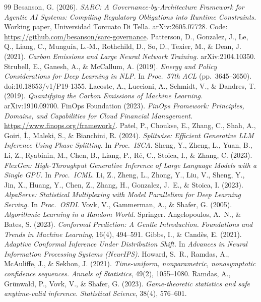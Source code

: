 \documentclass[11pt]{article}
\theoremstyle{plain}
\theoremstyle{definition}
\theoremstyle{remark}
\begin{document}
\begin{thebibliography}{99}
 Besanson, G. (2026). \emph{SARC: A Governance-by-Architecture Framework for Agentic AI Systems: Compiling Regulatory Obligations into Runtime Constraints.} Working paper, Universidad Torcuato Di Tella. arXiv:2605.07728. Code: \url{https://github.com/besanson/sarc-governance}.
 Patterson, D., Gonzalez, J., Le, Q., Liang, C., Mungu\'ia, L.-M., Rothchild, D., So, D., Texier, M., \& Dean, J. (2021). \emph{Carbon Emissions and Large Neural Network Training.} arXiv:2104.10350.
 Strubell, E., Ganesh, A., \& McCallum, A. (2019). \emph{Energy and Policy Considerations for Deep Learning in NLP.} In \emph{Proc.\ 57th ACL} (pp.~3645--3650). doi:10.18653/v1/P19-1355.
 Lacoste, A., Luccioni, A., Schmidt, V., \& Dandres, T. (2019). \emph{Quantifying the Carbon Emissions of Machine Learning.} arXiv:1910.09700.
 FinOps Foundation (2023). \emph{FinOps Framework: Principles, Domains, and Capabilities for Cloud Financial Management.} \url{https://www.finops.org/framework/}.
 Patel, P., Choukse, E., Zhang, C., Shah, A., Goiri, \'I., Maleki, S., \& Bianchini, R. (2024). \emph{Splitwise: Efficient Generative LLM Inference Using Phase Splitting.} In \emph{Proc.\ ISCA}.
 Sheng, Y., Zheng, L., Yuan, B., Li, Z., Ryabinin, M., Chen, B., Liang, P., R\'e, C., Stoica, I., \& Zhang, C. (2023). \emph{FlexGen: High-Throughput Generative Inference of Large Language Models with a Single GPU.} In \emph{Proc.\ ICML}.
 Li, Z., Zheng, L., Zhong, Y., Liu, V., Sheng, Y., Jin, X., Huang, Y., Chen, Z., Zhang, H., Gonzalez, J.~E., \& Stoica, I. (2023). \emph{AlpaServe: Statistical Multiplexing with Model Parallelism for Deep Learning Serving.} In \emph{Proc.\ OSDI}.
 Vovk, V., Gammerman, A., \& Shafer, G. (2005). \emph{Algorithmic Learning in a Random World.} Springer.
 Angelopoulos, A.~N., \& Bates, S. (2023). \emph{Conformal Prediction: A Gentle Introduction.} \emph{Foundations and Trends in Machine Learning}, 16(4), 494--591.
 Gibbs, I., \& Cand\`es, E. (2021). \emph{Adaptive Conformal Inference Under Distribution Shift.} In \emph{Advances in Neural Information Processing Systems (NeurIPS)}.
 Howard, S.~R., Ramdas, A., McAuliffe, J., \& Sekhon, J. (2021). \emph{Time-uniform, nonparametric, nonasymptotic confidence sequences.} \emph{Annals of Statistics}, 49(2), 1055--1080.
 Ramdas, A., Gr\"unwald, P., Vovk, V., \& Shafer, G. (2023). \emph{Game-theoretic statistics and safe anytime-valid inference.} \emph{Statistical Science}, 38(4), 576--601.

\end{thebibliography}
\end{document}
